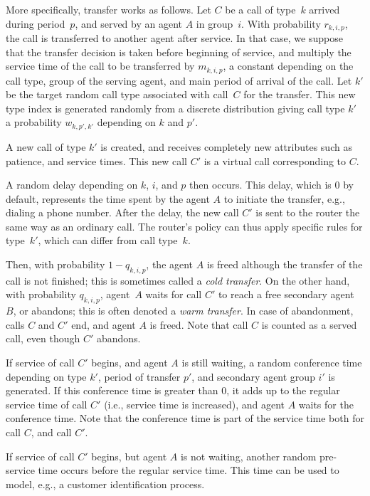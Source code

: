 More specifically, transfer works as follows.
Let $C$ be a call of type~$k$ arrived during period~$p$,
and served by an agent $A$ in
group~$i$.
With probability $r_{k,i, p}$, the call is transferred to another
agent after service.
In that case, we suppose that the transfer decision
is taken before beginning of service, and
multiply the service time of the call to be transferred by $m_{k,i,p}$,
a constant depending on the call type, group of the serving agent, and
main period of arrival of the call.
Let $k'$ be the target random call type associated with call~$C$ for
the transfer.
This new type index is generated randomly from a discrete
distribution giving
call type $k'$ a probability $w_{k,p',k'}$ depending on $k$ and $p'$.

A new call of type $k'$ is  created, and
receives completely new attributes such as patience, and
service times.
This new call $C'$ is a virtual call corresponding to $C$.

A random delay depending on $k$, $i$, and
$p$ then occurs.  This delay, which is 0 by default, represents the time
spent by the agent $A$ to initiate the transfer, e.g., dialing a phone
number.
After the delay,
the new call $C'$ is sent to the router the same way as an ordinary call.
The router's policy can thus apply specific rules for
type~$k'$, which can differ from call type~$k$.

Then, with probability $1-q_{k, i, p}$, the agent $A$ is freed
although the transfer of the call is not finished; this
is sometimes called a \emph{cold transfer}.
On the other hand,
with probability $q_{k, i, p}$, agent~$A$ waits for call $C'$ to reach
a free secondary agent $B$, or abandons;
this is often denoted a \emph{warm transfer}.
In case of abandonment, calls $C$ and $C'$ end, and agent $A$ is
freed.
Note that call $C$ is counted as a served call, even though $C'$
abandons.

If service of call $C'$ begins, and agent $A$ is still waiting, a
random conference time depending on
type $k'$, period of transfer $p'$, and secondary agent group $i'$ is
generated.
If this conference time is greater than 0, it adds up to the regular
service time of call $C'$ (i.e., service time is increased), and agent
$A$ waits for the conference time.
Note that the conference time is part of the service time both for
call $C$, and call $C'$.

If service of call $C'$ begins, but agent $A$ is not waiting,
another random pre-service time occurs before the regular service
time.
This time can be used to model, e.g., a customer identification
process.

